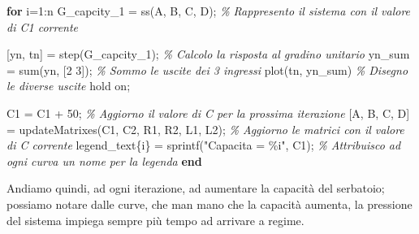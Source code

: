 \documentclass[
]{article}
\newenvironment{Shaded}{}{}
\newcommand{\CommentTok}[1]{\textcolor[rgb]{0.38,0.63,0.69}{\textit{#1}}}
\newcommand{\FloatTok}[1]{\textcolor[rgb]{0.25,0.63,0.44}{#1}}
\newcommand{\KeywordTok}[1]{\textcolor[rgb]{0.00,0.44,0.13}{\textbf{#1}}}
\newcommand{\NormalTok}[1]{#1}
\newcommand{\OperatorTok}[1]{\textcolor[rgb]{0.40,0.40,0.40}{#1}}
\newcommand{\StringTok}[1]{\textcolor[rgb]{0.25,0.44,0.63}{#1}}
\newcommand{\VariableTok}[1]{\textcolor[rgb]{0.10,0.09,0.49}{#1}}
\begin{document}
\begin{Shaded}
\begin{Highlighting}[]
\KeywordTok{for} \VariableTok{i}\OperatorTok{=}\FloatTok{1}\OperatorTok{:}\VariableTok{n}
    \VariableTok{G\_capcity\_1} \OperatorTok{=} \VariableTok{ss}\NormalTok{(}\VariableTok{A}\OperatorTok{,} \VariableTok{B}\OperatorTok{,} \VariableTok{C}\OperatorTok{,} \VariableTok{D}\NormalTok{)}\OperatorTok{;}       \CommentTok{\% Rappresento il sistema con il valore di C1 corrente}

\NormalTok{    [}\VariableTok{yn}\OperatorTok{,} \VariableTok{tn}\NormalTok{] }\OperatorTok{=} \VariableTok{step}\NormalTok{(}\VariableTok{G\_capcity\_1}\NormalTok{)}\OperatorTok{;}       \CommentTok{\% Calcolo la risposta al gradino unitario}
    \VariableTok{yn\_sum} \OperatorTok{=} \VariableTok{sum}\NormalTok{(}\VariableTok{yn}\OperatorTok{,}\NormalTok{ [}\FloatTok{2} \FloatTok{3}\NormalTok{])}\OperatorTok{;}            \CommentTok{\% Sommo le uscite dei 3 ingressi}
    \VariableTok{plot}\NormalTok{(}\VariableTok{tn}\OperatorTok{,} \VariableTok{yn\_sum}\NormalTok{)                    }\CommentTok{\% Disegno le diverse uscite}
    \VariableTok{hold} \VariableTok{on}\OperatorTok{;}

    \VariableTok{C1} \OperatorTok{=} \VariableTok{C1} \OperatorTok{+} \FloatTok{50}\OperatorTok{;}                       \CommentTok{\% Aggiorno il valore di C per la prossima iterazione}
\NormalTok{    [}\VariableTok{A}\OperatorTok{,} \VariableTok{B}\OperatorTok{,} \VariableTok{C}\OperatorTok{,} \VariableTok{D}\NormalTok{] }\OperatorTok{=} \VariableTok{updateMatrixes}\NormalTok{(}\VariableTok{C1}\OperatorTok{,} \VariableTok{C2}\OperatorTok{,} \VariableTok{R1}\OperatorTok{,} \VariableTok{R2}\OperatorTok{,} \VariableTok{L1}\OperatorTok{,} \VariableTok{L2}\NormalTok{)}\OperatorTok{;}  \CommentTok{\% Aggiorno le matrici con il valore di C corrente}
    \VariableTok{legend\_text}\NormalTok{\{}\VariableTok{i}\NormalTok{\} }\OperatorTok{=} \VariableTok{sprintf}\NormalTok{(}\StringTok{"Capacita\textquotesingle{} = \%i"}\OperatorTok{,} \VariableTok{C1}\NormalTok{)}\OperatorTok{;}         \CommentTok{\% Attribuisco ad ogni curva un nome per la legenda}
\KeywordTok{end}
\end{Highlighting}
\end{Shaded}

Andiamo quindi, ad ogni iterazione, ad aumentare la capacità del
serbatoio; possiamo notare dalle curve, che man mano che la capacità
aumenta, la pressione del sistema impiega sempre più tempo ad arrivare a
regime.
\end{document}
